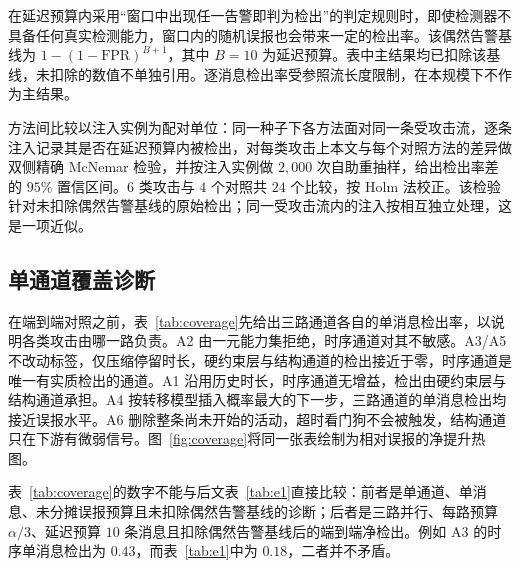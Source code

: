 \documentclass[manuscript,screen,review]{acmart}
\begin{document}
在延迟预算内采用``窗口中出现任一告警即判为检出''的判定规则时，即使检测器不具备任何真实检测能力，窗口内的随机误报也会带来一定的检出率。该偶然告警基线为 $1-(1-\mathrm{FPR})^{B+1}$，其中 $B=10$ 为延迟预算。表中主结果均已扣除该基线，未扣除的数值不单独引用。逐消息检出率受参照流长度限制，在本规模下不作为主结果。

方法间比较以注入实例为配对单位：同一种子下各方法面对同一条受攻击流，逐条注入记录其是否在延迟预算内被检出，对每类攻击上本文与每个对照方法的差异做双侧精确 {McNemar} 检验，并按注入实例做 $2{,}000$ 次自助重抽样，给出检出率差的 $95\%$ 置信区间。$6$ 类攻击与 $4$ 个对照共 $24$ 个比较，按 {Holm} 法校正。该检验针对未扣除偶然告警基线的原始检出；同一受攻击流内的注入按相互独立处理，这是一项近似。

\subsection{单通道覆盖诊断}
\label{sec:diag}

在端到端对照之前，表~\ref{tab:coverage}先给出三路通道各自的单消息检出率，以说明各类攻击由哪一路负责。{A2} 由一元能力集拒绝，时序通道对其不敏感。{A3}/{A5} 不改动标签，仅压缩停留时长，硬约束层与结构通道的检出接近于零，时序通道是唯一有实质检出的通道。{A1} 沿用历史时长，时序通道无增益，检出由硬约束层与结构通道承担。{A4} 按转移模型插入概率最大的下一步，三路通道的单消息检出均接近误报水平。{A6} 删除整条尚未开始的活动，超时看门狗不会被触发，结构通道只在下游有微弱信号。图~\ref{fig:coverage}将同一张表绘制为相对误报的净提升热图。

表~\ref{tab:coverage}的数字不能与后文表~\ref{tab:e1}直接比较：前者是单通道、单消息、未分摊误报预算且未扣除偶然告警基线的诊断；后者是三路并行、每路预算 $\alpha/3$、延迟预算 $10$ 条消息且扣除偶然告警基线后的端到端净检出。例如 {A3} 的时序单消息检出为 $0.43$，而表~\ref{tab:e1}中为 $0.18$，二者并不矛盾。
\end{document}
